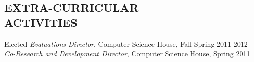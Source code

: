 \documentclass[line,margin]{res}
\begin{document}
\begin{resume}
\section{EXTRA-CURRICULAR \\ ACTIVITIES}             
            Elected {\it Evaluations Director}, Computer Science House, Fall-Spring 2011-2012 \\
	{\it Co-Research and Development Director}, Computer Science House, Spring 2011

 

\end{resume}
\end{document}
